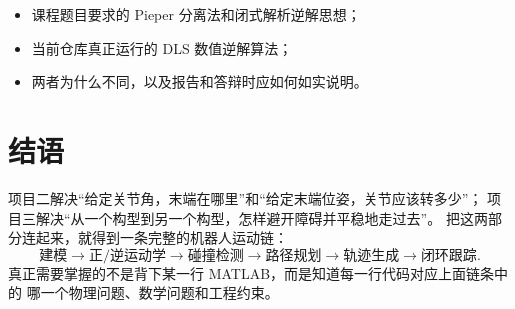 \documentclass[UTF8,a4paper,12pt,openany]{ctexbook}
\begin{document}
\begin{itemize}
  \item 课程题目要求的 Pieper 分离法和闭式解析逆解思想；
  \item 当前仓库真正运行的 DLS 数值逆解算法；
  \item 两者为什么不同，以及报告和答辩时应如何如实说明。
\end{itemize}

\tableofcontents
\listoffigures
\listoftables

\mainmatter





\appendix


\backmatter
\chapter*{结语}
项目二解决“给定关节角，末端在哪里”和“给定末端位姿，关节应该转多少”；
项目三解决“从一个构型到另一个构型，怎样避开障碍并平稳地走过去”。
把这两部分连起来，就得到一条完整的机器人运动链：
\[
\text{建模}\rightarrow\text{正/逆运动学}\rightarrow
\text{碰撞检测}\rightarrow\text{路径规划}\rightarrow
\text{轨迹生成}\rightarrow\text{闭环跟踪}.
\]
真正需要掌握的不是背下某一行 MATLAB，而是知道每一行代码对应上面链条中的
哪一个物理问题、数学问题和工程约束。
\end{document}
